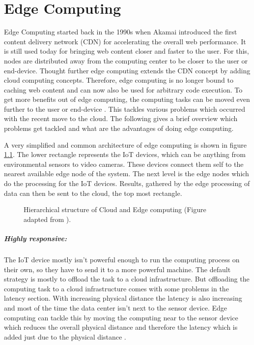 \chapter{Edge Computing}\label{chap:edge-computing}
Edge Computing started back in the 1990s when Akamai introduced the first content delivery network (CDN) for accelerating the overall web performance. It is still used today for bringing web content closer and faster to the user. For this, nodes are distributed away from the computing center to be closer to the user or end-device. Thought further edge computing extends the CDN concept by adding cloud computing concepts. Therefore, edge computing is no longer bound to caching web content and can now also be used for arbitrary code execution. To get more benefits out of edge computing, the computing tasks can be moved even further to the user or end-device \cite{Shi2016a}. This tackles various problems which occurred with the recent move to the cloud. The following gives a brief overview which problems get tackled and what are the advantages of doing edge computing.

\bigskip
A very simplified and common architecture of edge computing is shown in figure \ref{fig:hierarchical-cloud-edge-iot}. The lower rectangle represents the \gls{IoT} devices, which can be anything from environmental sensors to video cameras. These devices connect them self to the nearest available edge node of the system. The next level is the edge nodes which do the processing for the IoT devices. Results, gathered by the edge processing of data can then be sent to the cloud, the top most rectangle.

\begin{figure}[H]
    \centering
    \fontsize{9}{10}\selectfont
    \def\svgwidth{\textwidth}
    
    \caption{Hierarchical structure of Cloud and Edge computing (Figure adapted from \cite{Infineon2019}).}
    \label{fig:hierarchical-cloud-edge-iot}
\end{figure}

\bigskip
\paragraph{Highly responsive:} The IoT device mostly isn't powerful enough to run the computing process on their own, so they have to send it to a more powerful machine. The default strategy is mostly to offload the task to a cloud infrastructure. But offloading the computing task to a cloud infrastructure comes with some problems in the latency section. With increasing physical distance the latency is also increasing and most of the time the data center isn't next to the sensor device. Edge computing can tackle this by moving the computing near to the sensor device which reduces the overall physical distance and therefore the latency which is added just due to the physical distance \cite{Shi2016a}.

